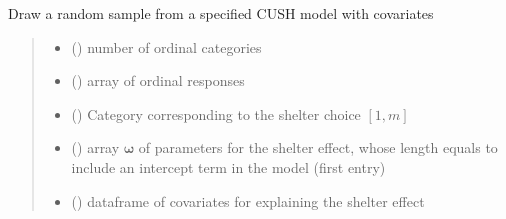 \documentclass[letterpaper,10pt,english]{sphinxmanual}
\begin{document}

\begin{fulllineitems}
\label{\detokenize{cubmods:cubmods.cush_x.draw}}
\pysigstartsignatures
{}
\pysigstopsignatures
\sphinxAtStartPar
Draw a random sample from a specified CUSH model with covariates
\begin{quote}\begin{description}
\begin{itemize}
\item {} 
\sphinxAtStartPar
{} () \textendash{} number of ordinal categories

\item {} 
\sphinxAtStartPar
{} () \textendash{} array of ordinal responses

\item {} 
\sphinxAtStartPar
{} () \textendash{} Category corresponding to the shelter choice \([1,m]\)

\item {} 
\sphinxAtStartPar
{} () \textendash{} array \(\pmb \omega\) of parameters for the shelter effect, whose length equals 
 to include an intercept term in the model (first entry)

\item {} 
\sphinxAtStartPar
{} () \textendash{} dataframe of covariates for explaining the shelter effect


\end{itemize}
\end{description}
\end{quote}
\end{fulllineitems}
\end{document}

